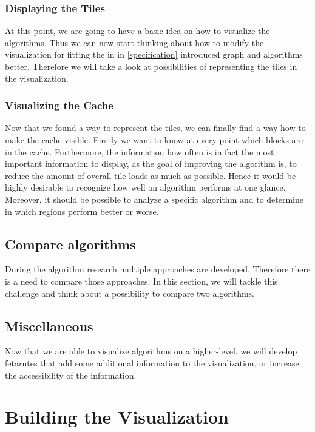 \documentclass
[
	paper = a4,
    pagesize,
	12 pt,
	oneside,                       %
    open = right,
	DIV = calc,
	BCOR = 0 mm,                   %
	bibtotoc
]
{scrbook}
\begin{document}
\subsection{Displaying the Tiles}

At this point, we are going to have a basic idea on how to visualize the algorithms.
Thus we can now start thinking about how to modify the visualization for fitting the in in \cref{specification} introduced graph and algorithms better.
Therefore we will take a look at possibilities of representing the tiles in the visualization.


\subsection{Visualizing the Cache}

Now that we found a way to represent the tiles, we can finally find a way how to make the cache visible.
Firstly we want to know at every point which blocks are in the cache.
Furthermore, the information how often is in fact the most important information to display, as the goal of improving the algorithm is, to reduce the amount of overall tile loads as much as possible.
Hence it would be highly desirable to recognize how well an algorithm performs at one glance.
Moreover, it should be possible to analyze a specific algorithm and to determine in which regions perform better or worse.


\section{Compare algorithms}


During the algorithm research multiple approaches are developed.
Therefore there is a need to compare those approaches.
In this section, we will tackle this challenge and think about a possibility to compare two algorithms.


\section{Miscellaneous}

Now that we are able to visualize algorithms on a higher-level, we will develop fetarutes that add some additional information to the visualization, or increase the accessibility of the information.



\chapter{Building the Visualization} \label{main}
\end{document}
